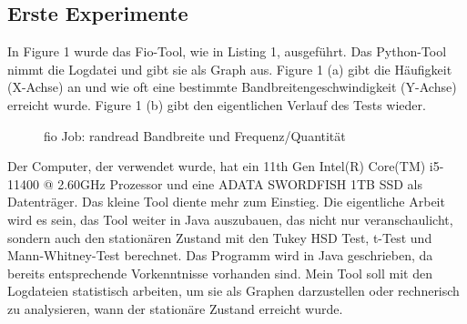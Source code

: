 \documentclass{article}
\begin{document}
\subsection{Erste Experimente}

In Figure 1 wurde das Fio-Tool, wie in Listing 1, ausgeführt. Das Python-Tool nimmt die Logdatei und gibt sie als Graph aus. Figure 1 (a) gibt die Häufigkeit (X-Achse) an und wie oft eine bestimmte Bandbreitengeschwindigkeit (Y-Achse) erreicht wurde.
Figure 1 (b) gibt den eigentlichen Verlauf des Tests wieder. 

\begin{figure}[H]%
    \centering
    \qquad
    \caption{fio Job: randread Bandbreite und Frequenz/Quantität}%
    \label{fig:log_graphs}%
\end{figure}


Der Computer, der verwendet wurde, hat ein 11th Gen Intel(R) Core(TM) i5-11400 @ 2.60GHz Prozessor und eine ADATA SWORDFISH 1TB SSD  als Datenträger.
Das kleine Tool diente mehr zum Einstieg. Die eigentliche Arbeit wird es sein, das Tool weiter in Java auszubauen, das nicht nur veranschaulicht,
sondern auch den stationären Zustand mit den Tukey HSD Test, t-Test und Mann-Whitney-Test berechnet.
Das Programm wird in Java geschrieben, da bereits entsprechende Vorkenntnisse vorhanden sind.
Mein Tool soll mit den Logdateien statistisch arbeiten, um sie als Graphen darzustellen oder rechnerisch zu analysieren, wann der stationäre Zustand erreicht wurde.
\end{document}
